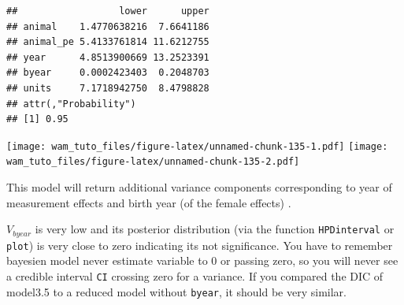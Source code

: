 \documentclass[
  12pt,
]{book}
\newenvironment{Shaded}{\begin{snugshade}}{\end{snugshade}}
\newcommand{\FloatTok}[1]{\textcolor[rgb]{0.00,0.00,0.81}{#1}}
\newcommand{\KeywordTok}[1]{\textcolor[rgb]{0.13,0.29,0.53}{\textbf{#1}}}
\newcommand{\NormalTok}[1]{#1}
\newcommand{\OperatorTok}[1]{\textcolor[rgb]{0.81,0.36,0.00}{\textbf{#1}}}
\begin{document}
\begin{verbatim}
##                  lower      upper
## animal    1.4770638216  7.6641186
## animal_pe 5.4133761814 11.6212755
## year      4.8513900669 13.2523391
## byear     0.0002423403  0.2048703
## units     7.1718942750  8.4798828
## attr(,"Probability")
## [1] 0.95
\end{verbatim}

\begin{Shaded}
\end{Shaded}

\texttt{[image: wam\_tuto\_files/figure-latex/unnamed-chunk-135-1.pdf]} \texttt{[image: wam\_tuto\_files/figure-latex/unnamed-chunk-135-2.pdf]}

This model will return additional variance components corresponding to year of measurement effects and birth year (of the female effects) .

\(V_{byear}\) is very low and its posterior distribution (via the function \texttt{HPDinterval} or \texttt{plot}) is very close to zero indicating its not significance. You have to remember bayesien model never estimate variable to 0 or passing zero, so you will never see a credible interval \texttt{CI} crossing zero for a variance.
If you compared the DIC of model3.5 to a reduced model without \texttt{byear}, it should be very similar.
\end{document}
